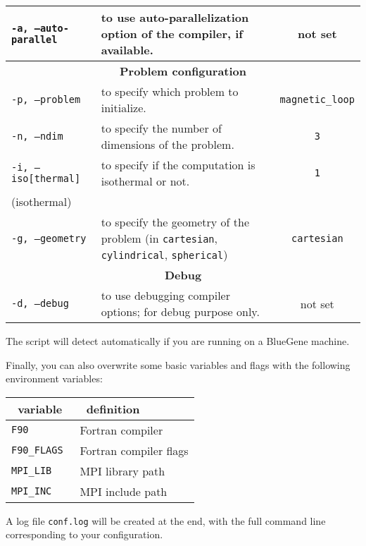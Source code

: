 \documentclass[a4paper,12pt]{article}
\begin{document}
\begin{table}[h!]
{\begin{tabular}{l | p{} | c }
      \texttt{-a, --auto-parallel} & to use auto-parallelization option of the compiler, if available. & not set \\
      \hline
      \multicolumn{3}{c}{\normalsize \bfseries Problem configuration} \\
      \hline
      \texttt{-p, --problem} & to specify which problem to initialize. & \texttt{magnetic\_loop} \\
      \texttt{-n, --ndim} & to specify the number of dimensions of the problem. & \texttt{3} \\
      \texttt{-i, --iso[thermal]} & to specify if the computation is isothermal or not. & \texttt{1} \\ (isothermal) \\
      \texttt{-g, --geometry} & to specify the geometry of the problem (in \texttt{cartesian}, \texttt{cylindrical}, \texttt{spherical}) & \texttt{cartesian} \\
      \hline
      \multicolumn{3}{c}{\normalsize \bfseries Debug} \\
      \hline
      \texttt{-d, --debug} & to use debugging compiler options; for debug purpose only. & not set \\
      \hline
    \end{tabular}
  }
\end{table}

The script will detect automatically if you are running on a BlueGene machine.


Finally, you can also overwrite some basic variables and flags with the following environment variables:

\begin{table}[h!]
  \centering
  {\footnotesize
    \begin{tabular}{l | l}
      ~\hfill variable\hfill~ & ~\hfill definition\hfill~ \\
      \hline
      \hline
      \texttt{F90} & Fortran compiler \\
      \texttt{F90\_FLAGS} & Fortran compiler flags \\
      \texttt{MPI\_LIB} & MPI library path \\
      \texttt{MPI\_INC} & MPI include path \\
      \hline
    \end{tabular}
  }
\end{table}

A log file \texttt{conf.log} will be created at the end, with the full command line corresponding to your configuration.
\end{document}

